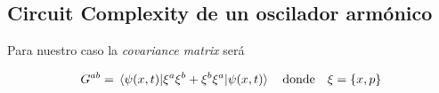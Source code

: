 \documentclass[../Main.tex]{subfiles}
\begin{document}
 
\subsection{Circuit Complexity de un oscilador armónico}
Para nuestro caso la \textit{covariance matrix} será

\begin{equation}
G^{ab}=\ev{\xi^{a}\xi^{b}+\xi^{b}\xi^{a}}{\psi(x,t)} \qq{donde} \xi=\{x ,p\}
\end{equation}
\end{document}
